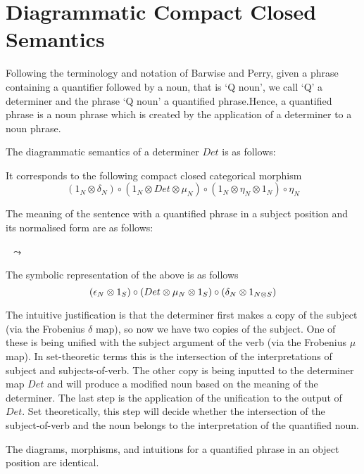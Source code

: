 \section{Diagrammatic  Compact Closed Semantics}


Following the terminology and notation of Barwise and  Perry, given a phrase containing a quantifier followed by a noun, that is `Q noun', we call `Q' a determiner and the phrase `Q noun' a quantified  phrase.Hence,  a quantified phrase is a noun phrase which is created by the application of a determiner to a noun phrase.  


The diagrammatic semantics of a determiner $Det$ is as follows:

\begin{center}
\end{center}

\noindent
It corresponds to the following compact closed categorical morphism
{\small
\[
(1_N \otimes \delta_N) \circ (1_N \otimes Det \otimes \mu_N) \circ (1_N \otimes \eta_N \otimes 1_N) \circ \eta_N 
\]}

\noindent
The meaning of the sentence with a quantified phrase in a subject position and its normalised form are as follows:


\begin{minipage}{20cm}
\begin{minipage}{7cm}
\end{minipage}
\ $\leadsto$ \
\begin{minipage}{5cm}
\end{minipage}
\end{minipage}


\noindent
The symbolic representation of the above is as follows
\[{\small
(\epsilon_N \otimes 1_S) \circ (Det \otimes  \mu_N \otimes 1_S) \circ (\delta_N \otimes 1_{N \otimes S})}
\]


The intuitive justification  is that the determiner first makes a copy of the subject (via the Frobenius $\delta$ map), so now we have two copies of the subject. One of these is being unified with the subject argument of the verb (via the Frobenius $\mu$ map). In set-theoretic terms this is the intersection of the interpretations of subject and subjects-of-verb. The other copy is being inputted to the determiner map $Det$ and will produce a modified noun based on the meaning of the determiner.  The last step is the application of the unification to the output of $Det$. Set theoretically, this step will decide whether the intersection of the subject-of-verb and the noun belongs to the interpretation of the quantified noun. 

 
The diagrams,  morphisms, and intuitions for a quantified phrase in an object position are identical.

